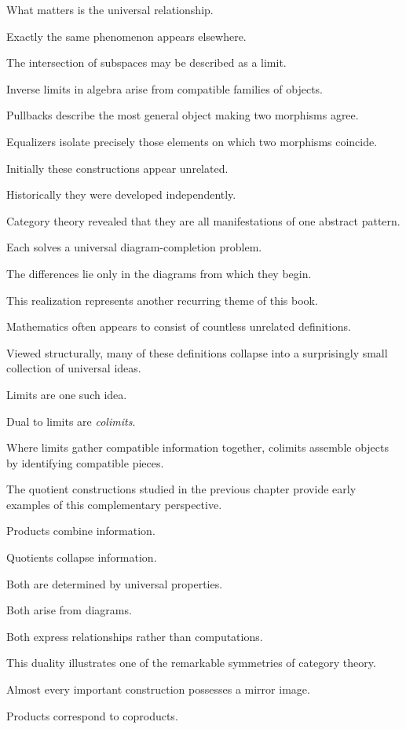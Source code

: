 \documentclass[11pt]{book}
\numberwithin{equation}{chapter}
\theoremstyle{definition}
\theoremstyle{plain}
\theoremstyle{remark}
\begin{document}
What matters is the universal relationship.

Exactly the same phenomenon appears elsewhere.

The intersection of subspaces may be described as a limit.

Inverse limits in algebra arise from compatible families of objects.

Pullbacks describe the most general object making two morphisms agree.

Equalizers isolate precisely those elements on which two morphisms coincide.

Initially these constructions appear unrelated.

Historically they were developed independently.

Category theory revealed that they are all manifestations of one abstract pattern.

Each solves a universal diagram-completion problem.

The differences lie only in the diagrams from which they begin.

This realization represents another recurring theme of this book.

Mathematics often appears to consist of countless unrelated definitions.

Viewed structurally, many of these definitions collapse into a surprisingly small collection of universal ideas.

Limits are one such idea.

Dual to limits are \emph{colimits}.

Where limits gather compatible information together, colimits assemble objects by identifying compatible pieces.

The quotient constructions studied in the previous chapter provide early examples of this complementary perspective.

Products combine information.

Quotients collapse information.

Both are determined by universal properties.

Both arise from diagrams.

Both express relationships rather than computations.

This duality illustrates one of the remarkable symmetries of category theory.

Almost every important construction possesses a mirror image.

Products correspond to coproducts.
\end{document}

